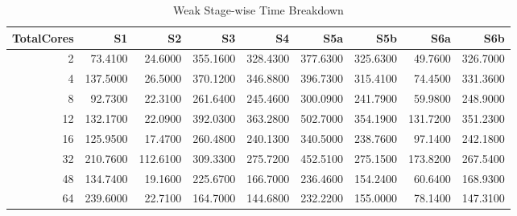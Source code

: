 \begin{table}
\caption{Weak Stage-wise Time Breakdown}
\label{tab:table9_stage_weak_time_table}
\begin{tabular}{rrrrrrrrr}
\toprule
TotalCores & S1 & S2 & S3 & S4 & S5a & S5b & S6a & S6b \\
\midrule
2 & 73.4100 & 24.6000 & 355.1600 & 328.4300 & 377.6300 & 325.6300 & 49.7600 & 326.7000 \\
4 & 137.5000 & 26.5000 & 370.1200 & 346.8800 & 396.7300 & 315.4100 & 74.4500 & 331.3600 \\
8 & 92.7300 & 22.3100 & 261.6400 & 245.4600 & 300.0900 & 241.7900 & 59.9800 & 248.9000 \\
12 & 132.1700 & 22.0900 & 392.0300 & 363.2800 & 502.7000 & 354.1900 & 131.7200 & 351.2300 \\
16 & 125.9500 & 17.4700 & 260.4800 & 240.1300 & 340.5000 & 238.7600 & 97.1400 & 242.1800 \\
32 & 210.7600 & 112.6100 & 309.3300 & 275.7200 & 452.5100 & 275.1500 & 173.8200 & 267.5400 \\
48 & 134.7400 & 19.1600 & 225.6700 & 166.7000 & 236.4600 & 154.2400 & 60.6400 & 168.9300 \\
64 & 239.6000 & 22.7100 & 164.7000 & 144.6800 & 232.2200 & 155.0000 & 78.1400 & 147.3100 \\
\bottomrule
\end{tabular}
\end{table}
